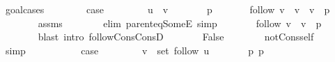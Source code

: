 \begin{isabellebody}
\endisataginvisible
{\isafoldinvisible}%
%
\isadeliminvisible
\isanewline
%
\endisadeliminvisible
%
\isadelimproof
%
\endisadelimproof
%
\isatagproof
{}\isamarkupfalse%
\ {\isacharparenleft}{\kern0pt}goal{\isacharunderscore}{\kern0pt}cases{\isacharparenright}{\kern0pt}\isanewline
\ \ \isamarkupfalse%
\ {}\isanewline
\ \ \isamarkupfalse%
\ {\isacharquery}{\kern0pt}case\isanewline
\ \ \isamarkupfalse%
\isanewline
\ \ \ \ \isamarkupfalse%
\ {\isachardoublequoteopen}u\ {\isacharequal}{\kern0pt}\ v{\isachardoublequoteclose}\isanewline
\ \ \ \ \isamarkupfalse%
\ \isamarkupfalse%
\ p\ \isanewline
\ \ \ \ \ \ {\isachardoublequoteopen}follow\ v\ {\isacharequal}{\kern0pt}\ v\ {\isacharhash}{\kern0pt}\ v\ {\isacharhash}{\kern0pt}\ p{\isachardoublequoteclose}\isanewline
\ \ \ \ \ \ \isamarkupfalse%
\ assms\isanewline
\ \ \ \ \ \ \isamarkupfalse%
\ {\isacharparenleft}{\kern0pt}elim\ parent{\isacharunderscore}{\kern0pt}eq{\isacharunderscore}{\kern0pt}SomeE{\isacharparenright}{\kern0pt}\ simp\isanewline
\ \ \ \ \isamarkupfalse%
\ \isamarkupfalse%
\ {\isachardoublequoteopen}follow\ v\ {\isacharequal}{\kern0pt}\ v\ {\isacharhash}{\kern0pt}\ p{\isachardoublequoteclose}\isanewline
\ \ \ \ \ \ \isamarkupfalse%
\ {\isacharparenleft}{\kern0pt}blast\ intro{\isacharcolon}{\kern0pt}\ follow{\isacharunderscore}{\kern0pt}Cons{\isacharunderscore}{\kern0pt}ConsD{\isacharparenleft}{\kern0pt}{}{\isacharparenright}{\kern0pt}{\isacharparenright}{\kern0pt}\isanewline
\ \ \ \ \isamarkupfalse%
\ \isamarkupfalse%
\ False\isanewline
\ \ \ \ \ \ \isamarkupfalse%
\ not{\isacharunderscore}{\kern0pt}Cons{\isacharunderscore}{\kern0pt}self\isanewline
\ \ \ \ \ \ \isamarkupfalse%
\ simp\isanewline
\ \ \isamarkupfalse%
\isanewline
{}\isamarkupfalse%
\isanewline
\ \ \isamarkupfalse%
\ {}\isanewline
\ \ \isamarkupfalse%
\ {\isacharquery}{\kern0pt}case\isanewline
\ \ \isamarkupfalse%
\isanewline
\ \ \ \ \isamarkupfalse%
\ {\isachardoublequoteopen}v\ {\isasymin}\ set\ {\isacharparenleft}{\kern0pt}follow\ u{\isacharparenright}{\kern0pt}{\isachardoublequoteclose}\isanewline
\ \ \ \ \isamarkupfalse%
\ \isamarkupfalse%
\ p\ p{\isacharprime}{\kern0pt}\ \isanewline

\end{isabellebody}
